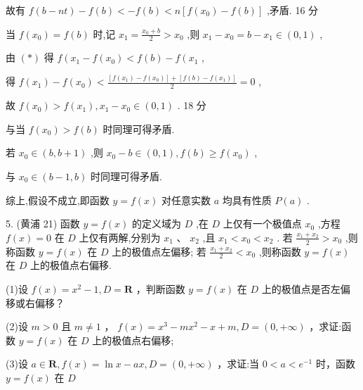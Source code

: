 \documentclass[10pt]{article}
\begin{document}
故有 \(f\left( {b - {nt}}\right)  - f\left( b\right)  <  - f\left( b\right)  < n\left\lbrack  {f\left( {x}_{0}\right)  - f\left( b\right) }\right\rbrack\) ,矛盾. 16 分

当 \(f\left( {x}_{0}\right)  = f\left( b\right)\) 时,记 \({x}_{1} = \frac{{x}_{0} + b}{2} > {x}_{0}\) ,则 \({x}_{1} - {x}_{0} = b - {x}_{1} \in  \left( {0,1}\right)\) ,

由 \(\left( *\right)\) 得 \(f\left( {{x}_{1} - f\left( {x}_{0}\right)  < f\left( b\right)  - f\left( {x}_{1}\right. }\right.\) ,

得 \(f\left( {x}_{1}\right)  - f\left( {x}_{0}\right)  < \frac{\left\lbrack  {f\left( {x}_{1}\right)  - f\left( {x}_{0}\right) }\right\rbrack   + \left\lbrack  {f\left( b\right)  - f\left( {x}_{1}\right) }\right\rbrack  }{2} = 0\) ,

故 \(f\left( {x}_{0}\right)  > f\left( {x}_{1}\right) ,{x}_{1} - {x}_{0} \in  \left( {0,1}\right)\) . 18 分

与当 \(f\left( {x}_{0}\right)  > f\left( b\right)\) 时同理可得矛盾.

若 \({x}_{0} \in  \left( {b,b + 1}\right)\) ,则 \({x}_{0} - b \in  \left( {0,1}\right) ,f\left( b\right)  \geq  f\left( {x}_{0}\right)\) ,

与 \({x}_{0} \in  \left( {b - 1,b}\right)\) 时同理可得矛盾.

综上,假设不成立,即函数 \(y = f\left( x\right)\) 对任意实数 \(a\) 均具有性质 \(P\left( a\right)\) .

5. (黄浦 21) 函数 \(y = f\left( x\right)\) 的定义域为 \(D\) ,在 \(D\) 上仅有一个极值点 \({x}_{0}\) ,方程 \(f\left( x\right)  = 0\) 在 \(D\) 上仅有两解,分别为 \({x}_{1}\text{ 、 }{x}_{2}\) ,且 \({x}_{1} < {x}_{0} < {x}_{2}\) . 若 \(\frac{{x}_{1} + {x}_{2}}{2} > {x}_{0}\) ,则称函数 \(y = f\left( x\right)\) 在 \(D\) 上的极值点左偏移; 若 \(\frac{{x}_{1} + {x}_{2}}{2} < {x}_{0}\) ,则称函数 \(y = f\left( x\right)\) 在 \(D\) 上的极值点右偏移.

(1)设 \(f\left( x\right)  = {x}^{2} - 1,D = \mathbf{R}\) ，判断函数 \(y = f\left( x\right)\) 在 \(D\) 上的极值点是否左偏移或右偏移？

(2)设 \(m > 0\) 且 \(m \neq  1\) ， \(f\left( x\right)  = {x}^{3} - m{x}^{2} - x + m,D = \left( {0, + \infty }\right)\) ，求证:函数 \(y = f\left( x\right)\) 在 \(D\) 上的极值点右偏移;

(3)设 \(a \in  \mathbf{R},f\left( x\right)  = \ln x - {ax},D = \left( {0, + \infty }\right)\) ，求证:当 \(0 < a < {e}^{-1}\) 时，函数 \(y = f\left( x\right)\) 在 \(D\)
\end{document}
